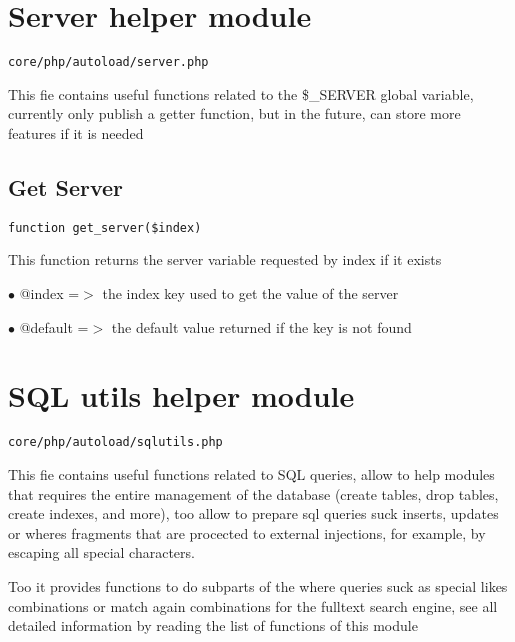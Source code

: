 \documentclass[a4paper]{book}
\begin{document}
\hypertarget{toc223}{}
\section{Server helper module}

\begin{lstlisting}
core/php/autoload/server.php
\end{lstlisting}

This fie contains useful functions related to the \$\_SERVER global variable, currently only publish
a getter function, but in the future, can store more features if it is needed

\hypertarget{toc224}{}
\subsection{Get Server}

\begin{lstlisting}
function get_server($index)
\end{lstlisting}

This function returns the server variable requested by index if it exists

\begin{compactitem}
\item[\color{myblue}$\bullet$] @index   =$>$ the index key used to get the value of the server
\item[\color{myblue}$\bullet$] @default =$>$ the default value returned if the key is not found
\end{compactitem}

\hypertarget{toc225}{}
\section{SQL utils helper module}

\begin{lstlisting}
core/php/autoload/sqlutils.php
\end{lstlisting}

This fie contains useful functions related to SQL queries, allow to help modules that requires
the entire management of the database (create tables, drop tables, create indexes, and more),
too allow to prepare sql queries suck inserts, updates or wheres fragments that are procected
to external injections, for example, by escaping all special characters.

Too it provides functions to do subparts of the where queries suck as special likes combinations
or match again combinations for the fulltext search engine, see all detailed information by
reading the list of functions of this module
\end{document}
